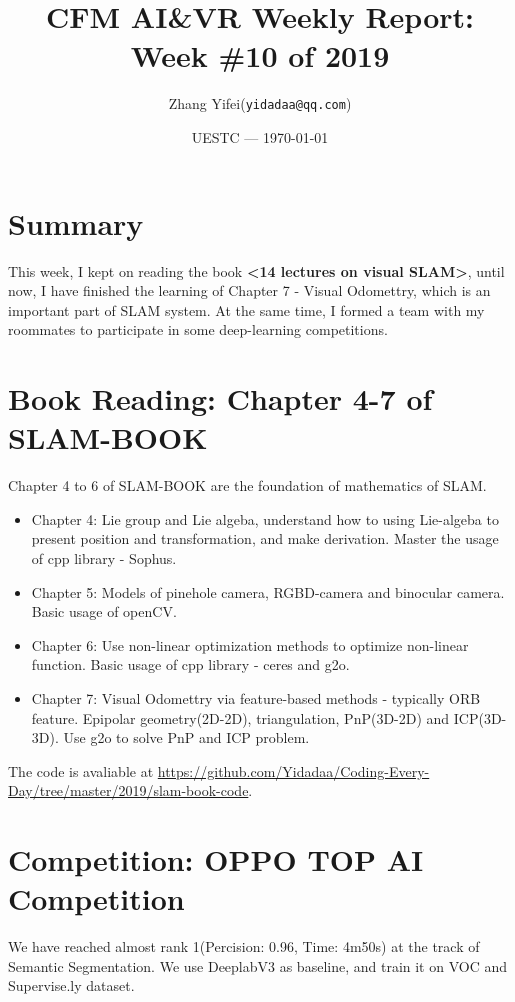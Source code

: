 \documentclass{article}
\title{CFM AI\&VR Weekly Report: Week \#10 of 2019}
\author{Zhang Yifei(\texttt{yidadaa@qq.com})}
\date{UESTC --- \today}
\begin{document}
    
    \maketitle

    \section{Summary}
    This week, I kept on reading the book \textbf{<14 lectures on visual SLAM>}, until now, I have finished the learning of Chapter 7 - Visual Odomettry, which is an important part of SLAM system. At the same time, I formed a team with my roommates to participate in some deep-learning competitions.

    \section{Book Reading: Chapter 4-7 of SLAM-BOOK}
    Chapter 4 to 6 of SLAM-BOOK are the foundation of mathematics of SLAM.
    \begin{itemize}
       \item Chapter 4: Lie group and Lie algeba, understand how to using Lie-algeba to present position and transformation, and make derivation. Master the usage of cpp library - Sophus. 
       \item Chapter 5: Models of pinehole camera, RGBD-camera and binocular camera. Basic usage of openCV.
       \item Chapter 6: Use non-linear optimization methods to optimize non-linear function. Basic usage of cpp library - ceres and g2o.
       \item Chapter 7: Visual Odomettry via feature-based methods - typically ORB feature. Epipolar geometry(2D-2D), triangulation, PnP(3D-2D) and ICP(3D-3D). Use g2o to solve PnP and ICP problem.
    \end{itemize}
    The code is avaliable at \url{https://github.com/Yidadaa/Coding-Every-Day/tree/master/2019/slam-book-code}.


    \section{Competition: OPPO TOP AI Competition}
    We have reached almost rank 1(Percision: 0.96, Time: 4m50s) at the track of Semantic Segmentation. We use DeeplabV3 as baseline, and train it on VOC and Supervise.ly dataset.
\end{document}
